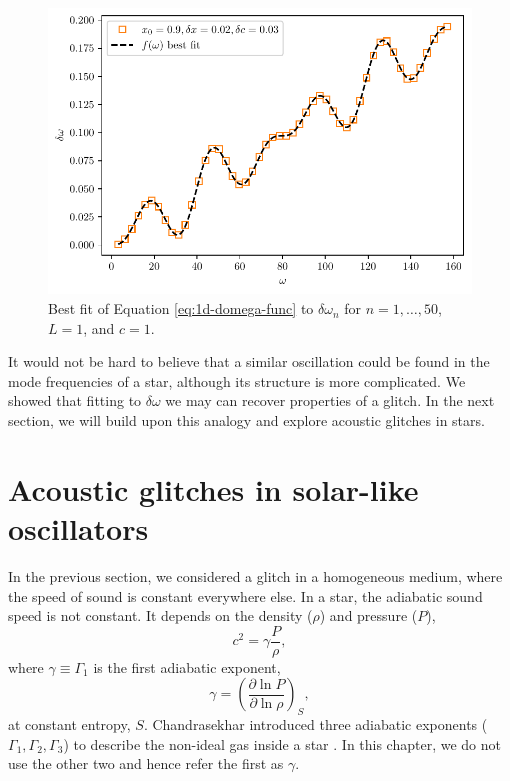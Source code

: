 \begin{figure}
    \centering
    \includegraphics{figures/glitch-1d-fit.pdf}
    \caption{Best fit of Equation \ref{eq:1d-domega-func} to \(\delta\omega_n\) for \(n=1,\dots,50\), \(L=1\), and \(c=1\).}
    \label{fig:1d-fit}
\end{figure}

It would not be hard to believe that a similar oscillation could be found in the mode frequencies of a star, although its structure is more complicated. We showed that fitting to \(\delta\omega\) we may can recover properties of a glitch. In the next section, we will build upon this analogy and explore acoustic glitches in stars.



\section[Glitches in stars]{Acoustic glitches in solar-like oscillators}

In the previous section, we considered a glitch in a homogeneous medium, where the speed of sound is constant everywhere else. In a star, the adiabatic sound speed is not constant. It depends on the density (\(\rho\)) and pressure (\(P\)),
%
\begin{equation}
    c^2 = \gamma \frac{P}{\rho},
\end{equation}
%
where \(\gamma \equiv \Gamma_1\) is the first adiabatic exponent,
%
\begin{equation}
    \gamma = \left( \frac{\partial \ln P}{\partial \ln \rho} \right)_S,
\end{equation}
%
at constant entropy, \(S\). Chandrasekhar introduced three adiabatic exponents (\(\Gamma_1,\Gamma_2,\Gamma_3\)) to describe the non-ideal gas inside a star \needcite{}. In this chapter, we do not use the other two and hence refer the first as \(\gamma\).

